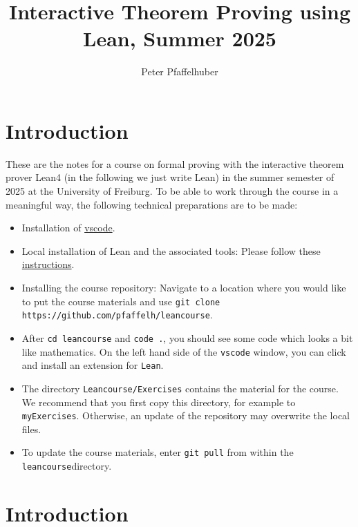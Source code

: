 \documentclass{memoir}
\title{\sffamily Interactive Theorem Proving using Lean, Summer 2025}
\author{\sffamily Peter Pfaffelhuber}
\date{\sffamily }
\begin{document}
\frontmatter

\begin{titlingpage}
\maketitle
\end{titlingpage}

\tableofcontents

\mainmatter

\chapter*{Introduction}
These are the notes for a course on formal proving with the interactive theorem prover Lean4 (in the following we just write Lean) in the summer semester of 2025 at the University of Freiburg. To be able to work through the course in a meaningful way, the following technical preparations are to be made:
\begin{itemize}
\item Installation of \hyperlink{"https://code.visualstudio.com/"}{vscode}.\item Local installation of Lean and the associated tools: Please follow these \hyperlink{"https://github.com/leanprover-community/mathlib4/wiki/Using-mathlib4-as-a-dependency"}{instructions}.\item Installing the course repository: Navigate to a location where you would like to put the course materials and use \Verb|git clone https://github.com/pfaffelh/leancourse|.\item After \Verb|cd leancourse| and \Verb|code .|, you should see some code which looks a bit like mathematics. On the left hand side of the \Verb|vscode| window, you can click and install an extension for \Verb|Lean|.\item The directory \Verb|Leancourse/Exercises| contains the material for the course. We recommend that you first copy this directory, for example to \Verb|myExercises|. Otherwise, an update of the repository may overwrite the local files.\item To update the course materials, enter \Verb|git pull| from within the \Verb|leancourse|directory.
\end{itemize}

\chapter{Introduction}
\end{document}
